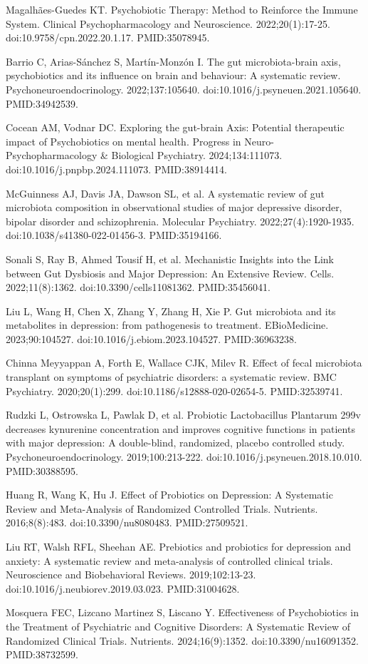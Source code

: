 \documentclass[11pt,oneside]{book}
\newcommand{\reff}[2]{\par\hangindent=7mm\hangafter=1\noindent[#1]\hspace{2mm}#2\par}
\begin{document}
\reff{36}{Magalhães-Guedes KT. Psychobiotic Therapy: Method to Reinforce the Immune System. Clinical Psychopharmacology and Neuroscience. 2022;20(1):17-25. doi:10.9758/cpn.2022.20.1.17. PMID:35078945.}
\reff{37}{Barrio C, Arias-Sánchez S, Martín-Monzón I. The gut microbiota-brain axis, psychobiotics and its influence on brain and behaviour: A systematic review. Psychoneuroendocrinology. 2022;137:105640. doi:10.1016/j.psyneuen.2021.105640. PMID:34942539.}
\reff{38}{Cocean AM, Vodnar DC. Exploring the gut-brain Axis: Potential therapeutic impact of Psychobiotics on mental health. Progress in Neuro-Psychopharmacology \& Biological Psychiatry. 2024;134:111073. doi:10.1016/j.pnpbp.2024.111073. PMID:38914414.}
\reff{39}{McGuinness AJ, Davis JA, Dawson SL, et al. A systematic review of gut microbiota composition in observational studies of major depressive disorder, bipolar disorder and schizophrenia. Molecular Psychiatry. 2022;27(4):1920-1935. doi:10.1038/s41380-022-01456-3. PMID:35194166.}
\reff{40}{Sonali S, Ray B, Ahmed Tousif H, et al. Mechanistic Insights into the Link between Gut Dysbiosis and Major Depression: An Extensive Review. Cells. 2022;11(8):1362. doi:10.3390/cells11081362. PMID:35456041.}
\reff{41}{Liu L, Wang H, Chen X, Zhang Y, Zhang H, Xie P. Gut microbiota and its metabolites in depression: from pathogenesis to treatment. EBioMedicine. 2023;90:104527. doi:10.1016/j.ebiom.2023.104527. PMID:36963238.}
\reff{42}{Chinna Meyyappan A, Forth E, Wallace CJK, Milev R. Effect of fecal microbiota transplant on symptoms of psychiatric disorders: a systematic review. BMC Psychiatry. 2020;20(1):299. doi:10.1186/s12888-020-02654-5. PMID:32539741.}
\reff{43}{Rudzki L, Ostrowska L, Pawlak D, et al. Probiotic Lactobacillus Plantarum 299v decreases kynurenine concentration and improves cognitive functions in patients with major depression: A double-blind, randomized, placebo controlled study. Psychoneuroendocrinology. 2019;100:213-222. doi:10.1016/j.psyneuen.2018.10.010. PMID:30388595.}
\reff{44}{Huang R, Wang K, Hu J. Effect of Probiotics on Depression: A Systematic Review and Meta-Analysis of Randomized Controlled Trials. Nutrients. 2016;8(8):483. doi:10.3390/nu8080483. PMID:27509521.}
\reff{45}{Liu RT, Walsh RFL, Sheehan AE. Prebiotics and probiotics for depression and anxiety: A systematic review and meta-analysis of controlled clinical trials. Neuroscience and Biobehavioral Reviews. 2019;102:13-23. doi:10.1016/j.neubiorev.2019.03.023. PMID:31004628.}
\reff{46}{Mosquera FEC, Lizcano Martinez S, Liscano Y. Effectiveness of Psychobiotics in the Treatment of Psychiatric and Cognitive Disorders: A Systematic Review of Randomized Clinical Trials. Nutrients. 2024;16(9):1352. doi:10.3390/nu16091352. PMID:38732599.}
\end{document}
